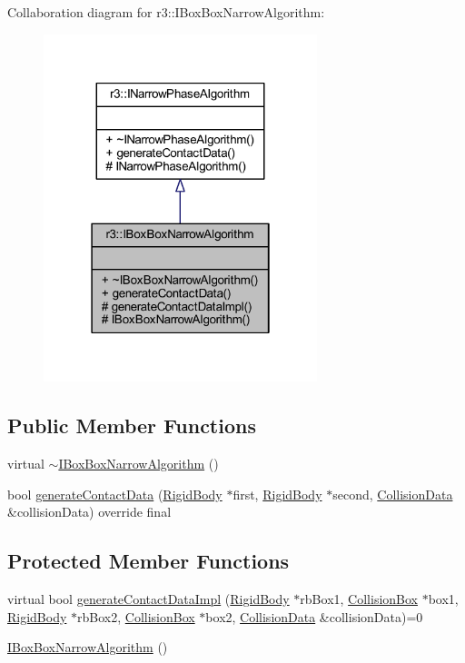 Collaboration diagram for r3\+:\+:I\+Box\+Box\+Narrow\+Algorithm\+:\nopagebreak
\begin{figure}[H]
\begin{center}
\leavevmode
\includegraphics[width=226pt]{classr3_1_1_i_box_box_narrow_algorithm__coll__graph}
\end{center}
\end{figure}
\subsection*{Public Member Functions}
\begin{DoxyCompactItemize}
\item 
virtual \mbox{\hyperlink{classr3_1_1_i_box_box_narrow_algorithm_a384c60f79ed845100877e62d7e2a10f4}{$\sim$\+I\+Box\+Box\+Narrow\+Algorithm}} ()
\item 
bool \mbox{\hyperlink{classr3_1_1_i_box_box_narrow_algorithm_a4b06ee2be38c248c59195082db64c3e3}{generate\+Contact\+Data}} (\mbox{\hyperlink{classr3_1_1_rigid_body}{Rigid\+Body}} $\ast$first, \mbox{\hyperlink{classr3_1_1_rigid_body}{Rigid\+Body}} $\ast$second, \mbox{\hyperlink{classr3_1_1_collision_data}{Collision\+Data}} \&collision\+Data) override final
\end{DoxyCompactItemize}
\subsection*{Protected Member Functions}
\begin{DoxyCompactItemize}
\item 
virtual bool \mbox{\hyperlink{classr3_1_1_i_box_box_narrow_algorithm_abc15898100b5ed0537e4c6ccc6610069}{generate\+Contact\+Data\+Impl}} (\mbox{\hyperlink{classr3_1_1_rigid_body}{Rigid\+Body}} $\ast$rb\+Box1, \mbox{\hyperlink{classr3_1_1_collision_box}{Collision\+Box}} $\ast$box1, \mbox{\hyperlink{classr3_1_1_rigid_body}{Rigid\+Body}} $\ast$rb\+Box2, \mbox{\hyperlink{classr3_1_1_collision_box}{Collision\+Box}} $\ast$box2, \mbox{\hyperlink{classr3_1_1_collision_data}{Collision\+Data}} \&collision\+Data)=0
\item 
\mbox{\hyperlink{classr3_1_1_i_box_box_narrow_algorithm_a9e01be1ba6e1bbd925fca03f36f06752}{I\+Box\+Box\+Narrow\+Algorithm}} ()
\end{DoxyCompactItemize}



